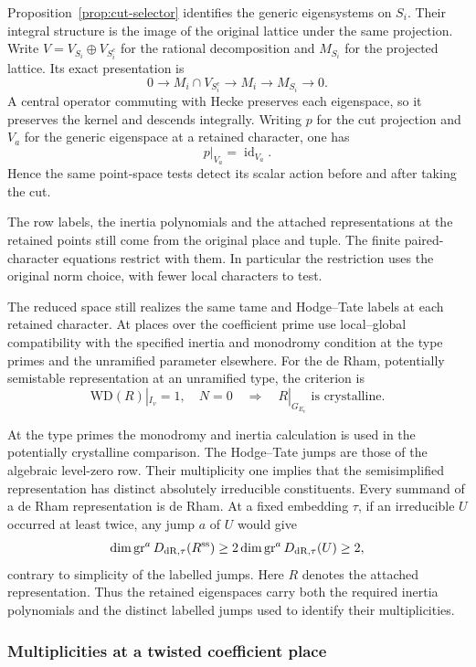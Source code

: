 Proposition~\ref{prop:cut-selector} identifies the generic eigensystems on \(S_i\). Their integral structure is the image of the original lattice under the same projection. Write \(V=V_{S_i}\oplus V_{S_i^c}\) for the rational
decomposition and \(M_{S_i}\) for the projected lattice.
Its exact presentation is
\[
  0\longrightarrow M_i\cap V_{S_i^c}
    \longrightarrow M_i\longrightarrow M_{S_i}\longrightarrow0.
\]
A central operator commuting with Hecke preserves each
eigenspace, so it preserves the kernel and descends integrally.
Writing \(p\) for the cut projection and \(V_a\) for the generic eigenspace at a retained character, one has
\[
 p|_{V_a}=\operatorname{id}_{V_a}.
\]
Hence the same point-space tests
detect its scalar action before and after taking the cut.

The row labels, the
inertia polynomials and the attached representations at the
retained points still come from the original place and tuple.
The finite paired-character equations restrict with them.
In particular the restriction uses the original norm choice,
with fewer local characters to test.

The reduced space still realizes the same tame and Hodge--Tate
labels at each retained character. At places over the coefficient prime use local--global compatibility with the specified inertia and monodromy condition at the type primes and the unramified parameter elsewhere. For the de Rham, potentially semistable representation at an unramified type, the criterion is
\[
 \mathrm{WD}(R)|_{I_v}=1,\quad N=0\quad\Longrightarrow\quad R|_{G_{E_v}}\text{ is crystalline}.
\]

At the
type primes the monodromy and inertia calculation is used in
the potentially crystalline comparison. The Hodge--Tate jumps
are those of the algebraic level-zero row. Their multiplicity
one implies that the semisimplified representation has distinct
absolutely irreducible constituents. Every summand of a de Rham representation is de Rham. At a fixed embedding \(\tau\), if an irreducible \(U\) occurred at least twice, any jump \(a\) of \(U\) would give
\[
 \dim\operatorname{gr}^a D_{\rm dR,\tau}(R^{\rm ss})\ge 2\dim\operatorname{gr}^a D_{\rm dR,\tau}(U)\ge2,
\]
contrary to simplicity of the labelled jumps. Here \(R\) denotes the attached representation. Thus the retained eigenspaces carry both the required inertia polynomials and the distinct labelled jumps used to identify their multiplicities.

\subsubsection*{Multiplicities at a twisted coefficient place}

